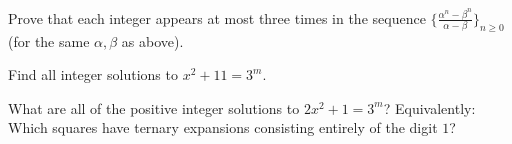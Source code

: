 \begin{challenge} Prove that each integer appears at most three times in the sequence $\{\frac{\alpha^n-\beta^n}{\alpha-\beta}\}_{n\ge 0}$ (for the same $\alpha,\beta$ as above).
\end{challenge}

\begin{challenge} Find all integer solutions to $x^2+11=3^m$.
\end{challenge}

\begin{challenge} What are all of the positive integer solutions to $2x^2+1 = 3^m$? Equivalently: Which squares have ternary expansions consisting entirely of the digit $1$?
\end{challenge}


